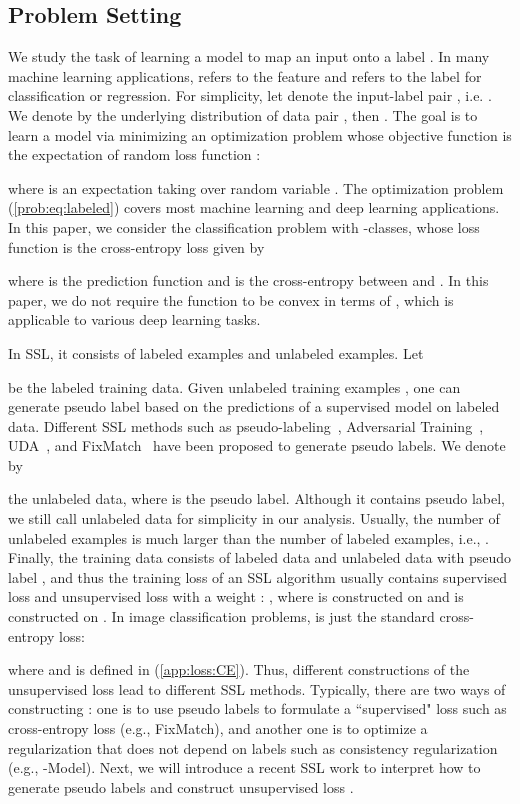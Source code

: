 \documentclass{article}
\begin{document}
\subsection{Problem Setting}
We study the task of learning a model to map an input  onto a label . In many machine learning applications,  refers to the feature and  refers to the label for classification or regression. For simplicity, let  denote the input-label pair , i.e. . We denote by  the underlying distribution of data pair , then . The goal is to learn a model  via minimizing an optimization problem whose objective function  is the expectation of random loss function :

where  is an expectation taking over random variable . The optimization problem (\ref{prob:eq:labeled}) covers most machine learning and deep learning applications. 
In this paper, we consider the classification problem with -classes, whose loss function is the cross-entropy loss given by

where  is the prediction function and  is the cross-entropy between  and . 
In this paper, we do not require the function  to be convex in terms of , which is applicable to various deep learning tasks.   

In SSL, it consists of labeled examples and unlabeled examples. Let

be the {labeled} training data. Given {unlabeled} training examples , one can generate pseudo label  based on the predictions of a supervised model on labeled data. Different SSL methods such as pseudo-labeling~\citep{lee2013pseudo},  Adversarial Training~\citep{miyato2018virtual}, UDA~\citep{xie2020unsupervised},  
and FixMatch~\citep{sohn2020fixmatch} have been proposed to generate pseudo labels. We denote by 

the unlabeled data, where  is the pseudo label. Although it contains pseudo label, we still call  unlabeled data for simplicity in our analysis. Usually, the number of unlabeled examples is much larger than the number of labeled examples, i.e., . Finally, the training data consists of labeled data  and unlabeled data with pseudo label , and thus the training loss of an SSL algorithm usually contains supervised loss  and unsupervised loss  with a weight : , where  is constructed on  and  is constructed on . In image classification problems,  is just the standard cross-entropy loss:

where  and  is defined in (\ref{app:loss:CE}). Thus, different constructions of the unsupervised loss  lead to different SSL methods. Typically, there are two ways of constructing : one is to use pseudo labels to formulate a  ``supervised" loss such as cross-entropy loss (e.g., FixMatch), and another one is to optimize a regularization that does not depend on labels such as consistency regularization (e.g., -Model). Next, we will introduce a recent SSL work to interpret how to generate pseudo labels and construct unsupervised loss .
\end{document}
